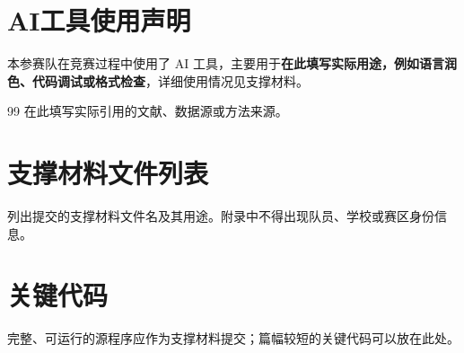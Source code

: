 \maketitle

\begin{abstract}
在此撰写摘要。建议用一页以内说明研究背景、三个问题的核心方法、主要定量结果、模型验证和结论，不在摘要中放置无法追溯的数字。

\end{abstract}










\section*{AI工具使用声明}
本参赛队在竞赛过程中使用了 AI 工具，主要用于\textbf{在此填写实际用途，例如语言润色、代码调试或格式检查}，详细使用情况见支撑材料。\par

\begin{thebibliography}{99}
 在此填写实际引用的文献、数据源或方法来源。
\end{thebibliography}

\begin{appendices}
\section{支撑材料文件列表}
列出提交的支撑材料文件名及其用途。附录中不得出现队员、学校或赛区身份信息。

\section{关键代码}
完整、可运行的源程序应作为支撑材料提交；篇幅较短的关键代码可以放在此处。\par
% 
\end{appendices}
